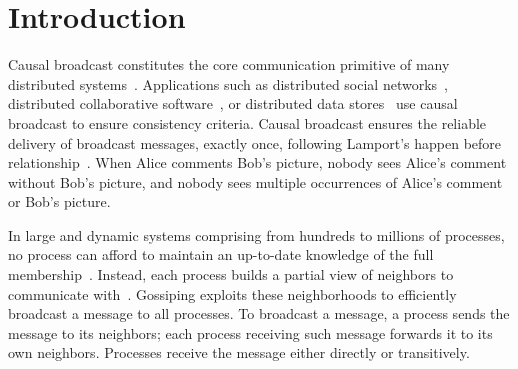  
\section{Introduction}

Causal broadcast constitutes the core communication primitive of many
distributed systems~\cite{hadzilacos1994modular}. Applications such as
distributed social networks~\cite{borthakur2013petabyte}, distributed
collaborative software~\cite{heinrich2012exploiting,nedelec2016crate}, or
distributed data
stores~\cite{bailis2013bolton,bravo2017saturn,demers1987epidemic,lloyd2011cops,shapiro2011comprehensive}
use causal broadcast to ensure consistency criteria.  Causal broadcast ensures
the reliable delivery of broadcast messages, exactly once, following Lamport's
happen before relationship~\cite{lamport1978time}. When Alice comments Bob's
picture, nobody sees Alice's comment without Bob's picture, and nobody sees
multiple occurrences of Alice's comment or Bob's picture.

In large and dynamic systems comprising from hundreds to millions of processes,
no process can afford to maintain an up-to-date knowledge of the full
membership~\cite{birman1999bimodal,demers1987epidemic}. Instead, each process
builds a partial view of neighbors to communicate
with~\cite{jelasity2007gossip}. Gossiping exploits these neighborhoods to
efficiently broadcast a message to all processes. To broadcast a message, a
process sends the message to its neighbors; each process receiving such message
forwards it to its own neighbors. Processes receive the message either directly
or transitively. 



